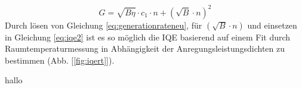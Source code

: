 \begin{equation}
    G = \sqrt{B \eta} \cdot c_1\cdot n + (\sqrt{B} \cdot n)^2
    \label{eq:generationrateneu}
\end{equation}  
Durch lösen von Gleichung \ref{eq:generationrateneu}, für $(\sqrt{B} \cdot n)$ und einsetzen in Gleichung \ref{eq:iqe2} ist es so möglich die IQE basierend auf einem Fit durch Raumtemperaturmessung in Abhängigkeit der Anregungsleistungsdichten zu bestimmen (Abb. [\ref{fig:iqert}]).

hallo

